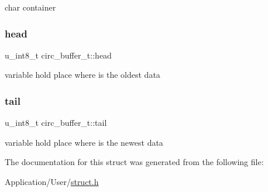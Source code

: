 char container \mbox{\label{structcirc__buffer__t_aef8f62f80f1f898826f8289c3c8ee3e1}} 
\subsubsection{\texorpdfstring{head}{head}}
{\footnotesize\ttfamily u\+\_\+int8\+\_\+t circ\+\_\+buffer\+\_\+t\+::head}

variable hold place where is the oldest data \mbox{\label{structcirc__buffer__t_ac263e578598ba3ca3c25af3977450e27}} 
\subsubsection{\texorpdfstring{tail}{tail}}
{\footnotesize\ttfamily u\+\_\+int8\+\_\+t circ\+\_\+buffer\+\_\+t\+::tail}

variable hold place where is the newest data 

The documentation for this struct was generated from the following file\+:\begin{DoxyCompactItemize}
\item 
Application/\+User/\hyperlink{struct_8h}{struct.\+h}\end{DoxyCompactItemize}

